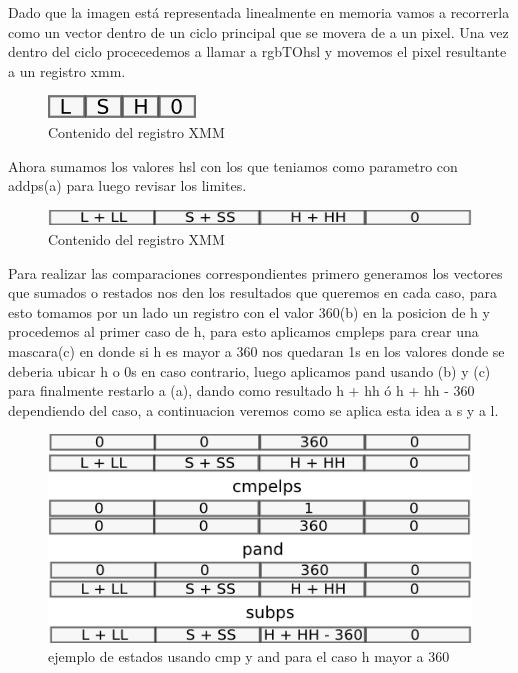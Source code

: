 \documentclass[a4paper]{article}
\begin{document}
Dado que la imagen está representada linealmente en memoria vamos a recorrerla como un vector dentro de un ciclo principal que se movera de a un pixel. Una vez dentro del ciclo procecedemos a llamar a rgbTOhsl y movemos el pixel resultante a un registro xmm.

\begin{figure}[H]
\centering
\includegraphics[scale=0.8]{imagenes/lsh.png}
\caption{Contenido del registro XMM}
\label{lshValue5}
\end{figure}

Ahora sumamos los valores hsl con los que teniamos como parametro con addps(a) para luego revisar los limites.

\begin{figure}[H]
\centering
\includegraphics[scale=0.8]{imagenes/sumahsl.png}
\caption{Contenido del registro XMM}
\label{lshValue4}
\end{figure}

Para realizar las comparaciones correspondientes primero generamos los vectores que sumados o restados nos den los resultados que queremos en cada caso, para esto tomamos por un lado un registro con el valor 360(b) en la posicion de h y procedemos al primer caso de h, para esto aplicamos cmpleps para crear una mascara(c) en donde si h es mayor a 360 nos quedaran 1s en los valores donde se deberia ubicar h o 0s en caso contrario, luego aplicamos pand usando (b) y (c) para finalmente restarlo a (a), dando como resultado h + hh ó h + hh - 360 dependiendo del caso, a continuacion veremos como se aplica esta idea a s y a l.

\begin{figure}[H]
\centering
\includegraphics[scale=0.8]{imagenes/caso1hsumahsl.png}
\caption{ejemplo de estados usando cmp y and para el caso h mayor a 360}
\label{lshValue3}
\end{figure}
\end{document}
